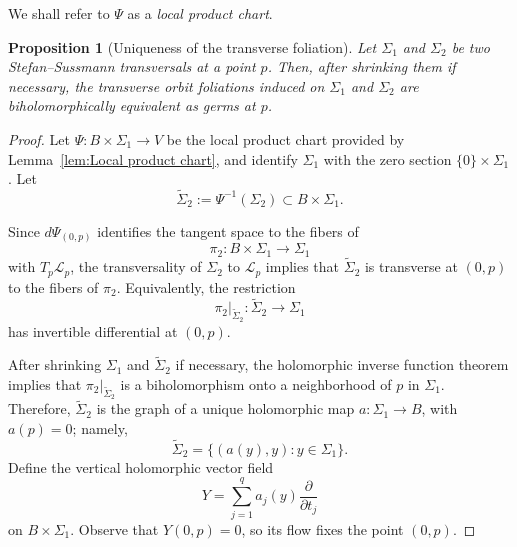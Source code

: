 \documentclass[11pt]{amsart}
\newtheorem{proposition}[theorem]{Proposition}
\theoremstyle{definition}
\theoremstyle{remark}
\newcommand{\leaf}[1]{\mathcal{L}_{#1}}
\begin{document}
We shall refer to $\Psi$ as a \emph{local product chart}.

\begin{proposition}[Uniqueness of the transverse foliation]\label{Uniqueness transverse foliation}
	Let $\Sigma_1$ and $\Sigma_2$ be two Stefan--Sussmann transversals at a point $p$.
	Then, after shrinking them if necessary, the transverse orbit foliations induced on $\Sigma_1$ and $\Sigma_2$ are biholomorphically equivalent as germs at $p$.
\end{proposition}

\begin{proof}
	Let $\Psi:B\times\Sigma_1\longrightarrow V$ be the local product chart provided by Lemma~\ref{lem:Local product chart}, and identify $\Sigma_1$ with the zero section $\{0\}\times\Sigma_1$.
	Let
	$$
		\widetilde{\Sigma}_2:=\Psi^{-1}(\Sigma_2)\subset B\times\Sigma_1.
	$$

	Since $d\Psi_{(0,p)}$ identifies the tangent space to the fibers of 
	\[
		\pi_2:B\times\Sigma_1\longrightarrow\Sigma_1
	\]
	with $T_p\leaf{p} $, the transversality of $\Sigma_2$ to $\leaf{p}$ implies that $\widetilde{\Sigma}_2$ is transverse at $(0,p)$ to the fibers of $\pi_2$.
	Equivalently, the restriction 
	\[
		\pi_2|_{\widetilde{\Sigma}_2}: \widetilde{\Sigma}_2 \longrightarrow \Sigma_1
	\]
	has invertible differential at $(0,p)$.

	After shrinking $\Sigma_1$ and $\widetilde{\Sigma}_2$ if necessary, the holomorphic inverse function theorem implies that $\pi_2|_{\widetilde{\Sigma}_2}$ is a biholomorphism onto a neighborhood of $p$ in $\Sigma_1$.
	Therefore, $\widetilde{\Sigma}_2$ is the graph of a unique holomorphic map $a:\Sigma_1\longrightarrow B$, with $a(p)=0$; namely,
	\[
		\widetilde{\Sigma}_2 = \{(a(y),y):y\in\Sigma_1\}.
	\]
	Define the vertical holomorphic vector field 
	\[
		Y = \sum_{j=1}^q a_j(y)\frac{\partial}{\partial t_j}
	\]
	on $B\times\Sigma_1$.
	Observe that $Y(0,p)=0$, so its flow fixes the point $(0,p)$.


\end{proof}
\end{document}
